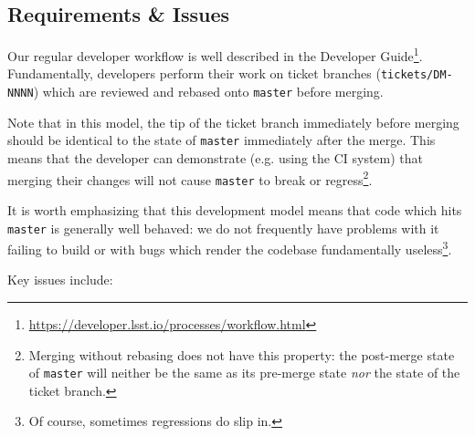 \documentclass[letterpaper]{scrartcl}
\begin{document}
\subsection{Requirements \& Issues}

Our regular developer workflow is well described in the Developer
Guide\footnote{\url{https://developer.lsst.io/processes/workflow.html}}.
Fundamentally, developers perform their work on ticket branches
(\texttt{tickets/DM-NNNN}) which are reviewed and rebased onto \texttt{master}
before merging.

Note that in this model, the tip of the ticket branch immediately before
merging should be identical to the state of \texttt{master} immediately after
the merge. This means that the developer can demonstrate (e.g. using the CI
system) that merging their changes will not cause \texttt{master} to break or
regress\footnote{Merging without rebasing does not have this property: the
post-merge state of \texttt{master} will neither be the same as its pre-merge
state \textit{nor} the state of the ticket branch.}.

It is worth emphasizing that this development model means that code which hits
\texttt{master} is generally well behaved: we do not frequently have problems
with it failing to build or with bugs which render the codebase fundamentally
useless\footnote{Of course, sometimes regressions do slip in.}.

Key issues include:
\end{document}
